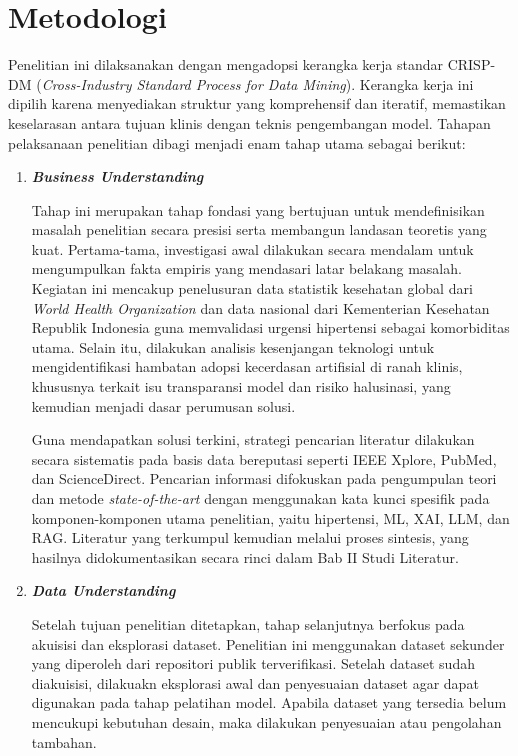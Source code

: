 \section{Metodologi}
Penelitian ini dilaksanakan dengan mengadopsi kerangka kerja standar CRISP-DM (\textit{Cross-Industry Standard Process for Data Mining}). Kerangka kerja ini dipilih karena menyediakan struktur yang komprehensif dan iteratif, memastikan keselarasan antara tujuan klinis dengan teknis pengembangan model. Tahapan pelaksanaan penelitian dibagi menjadi enam tahap utama sebagai berikut:

\begin{enumerate}
    \item \textbf{\textit{Business Understanding}}
    
    Tahap ini merupakan tahap fondasi yang bertujuan untuk mendefinisikan masalah penelitian secara presisi serta membangun landasan teoretis yang kuat. Pertama-tama, investigasi awal dilakukan secara mendalam untuk mengumpulkan fakta empiris yang mendasari latar belakang masalah. Kegiatan ini mencakup penelusuran data statistik kesehatan global dari \textit{World Health Organization} dan data nasional dari Kementerian Kesehatan Republik Indonesia guna memvalidasi urgensi hipertensi sebagai komorbiditas utama. Selain itu, dilakukan analisis kesenjangan teknologi untuk mengidentifikasi hambatan adopsi kecerdasan artifisial di ranah klinis, khususnya terkait isu transparansi model dan risiko halusinasi, yang kemudian menjadi dasar perumusan solusi.
    
    Guna mendapatkan solusi terkini, strategi pencarian literatur dilakukan secara sistematis pada basis data bereputasi seperti IEEE Xplore, PubMed, dan ScienceDirect. Pencarian informasi difokuskan pada pengumpulan teori dan metode \textit{state-of-the-art} dengan menggunakan kata kunci spesifik pada komponen-komponen utama penelitian, yaitu hipertensi, ML, XAI, LLM, dan RAG. Literatur yang terkumpul kemudian melalui proses sintesis, yang hasilnya didokumentasikan secara rinci dalam Bab II Studi Literatur.

    \item \textbf{\textit{Data Understanding}}
    
    Setelah tujuan penelitian ditetapkan, tahap selanjutnya berfokus pada akuisisi dan eksplorasi dataset. Penelitian ini menggunakan dataset sekunder yang diperoleh dari repositori publik terverifikasi. Setelah dataset sudah diakuisisi, dilakuakn eksplorasi awal dan penyesuaian dataset agar dapat digunakan pada tahap pelatihan model. Apabila dataset yang tersedia belum mencukupi kebutuhan desain, maka dilakukan penyesuaian atau pengolahan tambahan.


\end{enumerate}
